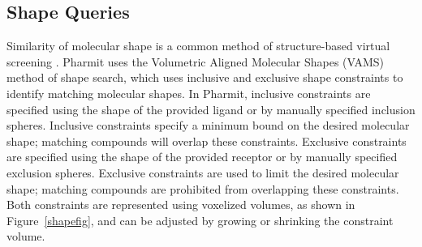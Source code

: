 \subsection{Shape Queries}

Similarity of molecular shape is a common method of structure-based virtual screening \cite{Nicholls_2010}.  Pharmit uses the Volumetric Aligned Molecular Shapes (VAMS) \cite{vams} method of shape search, which uses inclusive and exclusive shape constraints to identify matching molecular shapes.  In Pharmit, inclusive constraints are specified using the shape of the provided ligand or by manually specified inclusion spheres. Inclusive constraints specify a minimum bound on the desired molecular shape; matching compounds will overlap these constraints. Exclusive constraints are specified using the shape of the provided receptor or by manually specified exclusion spheres.  Exclusive constraints are used to limit the desired molecular shape; matching compounds are prohibited from overlapping these constraints.  Both constraints are represented using voxelized volumes, as shown in Figure~\ref{shapefig}, and can be adjusted by growing or shrinking the constraint volume.

